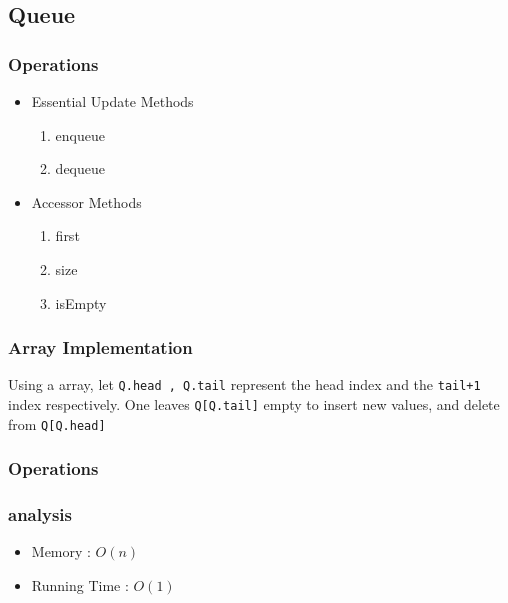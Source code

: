 \subsection{Queue}



		\subsubsection{Operations}
				\begin{itemize}
						\item Essential Update Methods
						\begin{enumerate}
								\item enqueue
								\item dequeue
						\end{enumerate}
				\end{itemize}
				\begin{itemize}
						\item Accessor Methods
						\begin{enumerate}
								\item first
								\item size
								\item isEmpty
						\end{enumerate}
				\end{itemize}
				
		\subsubsection{Array Implementation}
				
				\par{Using a  array, let \texttt{Q.head , Q.tail} represent the head index and the \texttt{tail+1} index respectively. One leaves \texttt{Q[Q.tail]} empty to insert new values, and delete from \texttt{Q[Q.head]}}

		\subsubsection{Operations}


		\subsubsection{analysis}
			\begin{itemize}
				\item[] Memory : $O(n)$
				\item[] Running Time : $O(1)$
				\end{itemize}	


